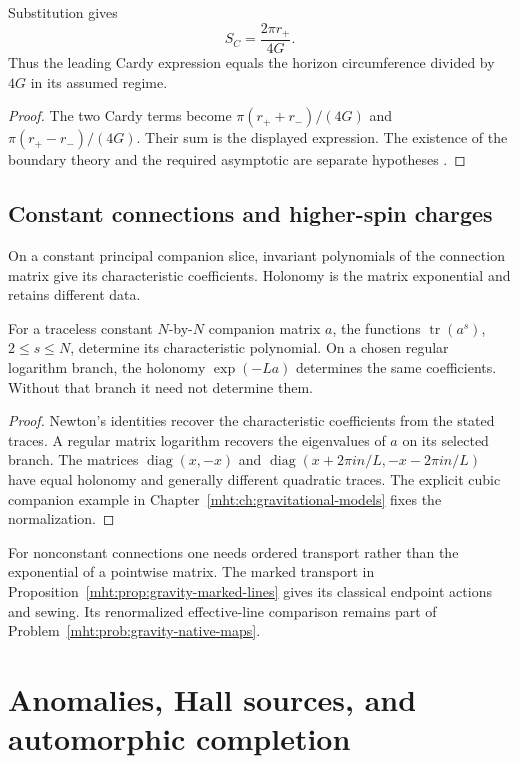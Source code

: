 \begin{theorem}
Substitution gives
\[
 S_C=\frac{2\pi r_+}{4G}.
\]
Thus the leading Cardy expression equals the horizon
circumference divided by $4G$ in its assumed regime.
\end{theorem}
\begin{proof}
The two Cardy terms become
$\pi(r_++r_-)/(4G)$ and $\pi(r_+-r_-)/(4G)$.
Their sum is the displayed expression.
The existence of the boundary theory and the required
asymptotic are separate hypotheses
\cite{Cardy1986,BTZ1992}.
\end{proof}

\chapter{Constant connections and higher-spin charges}
On a constant principal companion slice, invariant
polynomials of the connection matrix give its characteristic
coefficients.
Holonomy is the matrix exponential and retains different data.

\begin{theorem}
For a traceless constant $N$-by-$N$ companion matrix $a$,
the functions $\operatorname{tr}(a^s)$, $2\le s\le N$,
determine its characteristic polynomial.
On a chosen regular logarithm branch, the holonomy
$\exp(-La)$ determines the same coefficients.
Without that branch it need not determine them.
\end{theorem}
\begin{proof}
Newton's identities recover the characteristic coefficients
from the stated traces.
A regular matrix logarithm recovers the eigenvalues of $a$
on its selected branch.
The matrices $\operatorname{diag}(x,-x)$ and
$\operatorname{diag}(x+2\pi i n/L,-x-2\pi i n/L)$ have equal
holonomy and generally different quadratic traces.
The explicit cubic companion example in
Chapter~\ref{mht:ch:gravitational-models} fixes the normalization.
\end{proof}

For nonconstant connections one needs ordered transport
rather than the exponential of a pointwise matrix.
The marked transport in
Proposition~\ref{mht:prop:gravity-marked-lines} gives its classical
endpoint actions and sewing.
Its renormalized effective-line comparison remains part of
Problem~\ref{mht:prob:gravity-native-maps}.


\part{Anomalies, Hall sources, and automorphic completion}


